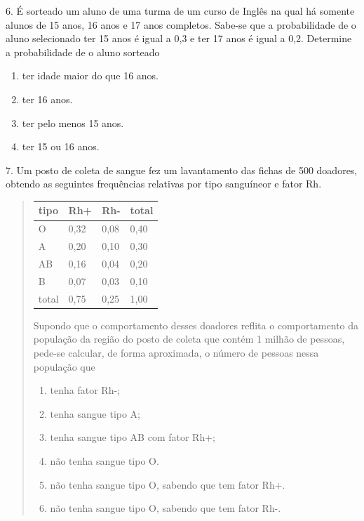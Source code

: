 \(6.\) É sorteado um aluno de uma turma de um curso de Inglês na qual há somente alunos de 15 anos, 16 anos e 17 anos completos. Sabe-se que a  probabilidade de o aluno selecionado ter 15 anos é igual a 0,3 e ter 17 anos é igual a 0,2.
Determine a probabilidade de o aluno sorteado
\begin{enumerate}
\item {} 
ter idade maior do que 16 anos.

\item {} 
ter 16 anos.

\item {} 
ter pelo menos 15 anos.

\item {} 
ter 15 ou 16 anos.

\end{enumerate}

\(7.\) Um posto de coleta de sangue fez um lavantamento das fichas de 500 doadores, obtendo as seguintes frequências relativas por tipo sanguíneor e fator Rh.
\begin{quote}


\begin{savenotes}\sphinxattablestart
\centering
\begin{tabulary}{\linewidth}[t]{|T|T|T|T|}
\hline

tipo
&
Rh+
&
Rh-
&
total
\\
\hline
O
&
0,32
&
0,08
&
0,40
\\
\hline
A
&
0,20
&
0,10
&
0,30
\\
\hline
AB
&
0,16
&
0,04
&
0,20
\\
\hline
B
&
0,07
&
0,03
&
0,10
\\
\hline
total
&
0,75
&
0,25
&
1,00
\\
\hline
\end{tabulary}
\par
\sphinxattableend\end{savenotes}

Supondo que o comportamento desses doadores reflita o comportamento da população da região do posto de coleta que contém 1 milhão de pessoas, pede-se calcular, de forma aproximada, o número de pessoas nessa população que
\begin{enumerate}
\item {} 
tenha fator Rh-;

\item {} 
tenha sangue tipo A;

\item {} 
tenha sangue tipo AB com fator Rh+;

\item {} 
não tenha sangue tipo O.

\item {} 
não tenha sangue tipo O, sabendo que tem fator Rh+.

\item {} 
não tenha sangue tipo O, sabendo que tem fator Rh-.

\end{enumerate}
\end{quote}

